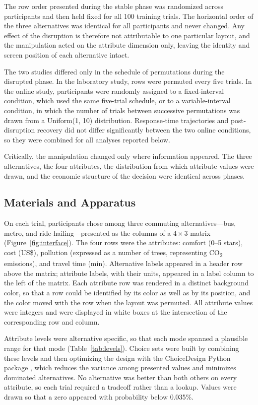 \documentclass[man,natbib,floatsintext]{apa7}
\begin{document}
The row order presented during the stable phase was randomized across participants and then held fixed for all 100 training trials. The horizontal order of the three alternatives was identical for all participants and never changed. Any effect of the disruption is therefore not attributable to one particular layout, and the manipulation acted on the attribute dimension only, leaving the identity and screen position of each alternative intact.

The two studies differed only in the schedule of permutations during the disrupted phase. In the laboratory study, rows were permuted every five trials. In the online study, participants were randomly assigned to a fixed-interval condition, which used the same five-trial schedule, or to a variable-interval condition, in which the number of trials between successive permutations was drawn from a Uniform(1, 10) distribution. Response-time trajectories and post-disruption recovery did not differ significantly between the two online conditions, so they were combined for all analyses reported below.

Critically, the manipulation changed only where information appeared. The three alternatives, the four attributes, the distribution from which attribute values were drawn, and the economic structure of the decision were identical across phases.

\subsection{Materials and Apparatus}

On each trial, participants chose among three commuting alternatives---bus, metro, and ride-hailing---presented as the columns of a $4 \times 3$ matrix (Figure~\ref{fig:interface}). The four rows were the attributes: comfort (0--5 stars), cost (US\$), pollution (expressed as a number of trees, representing CO\textsubscript{2} emissions), and travel time (min). Alternative labels appeared in a header row above the matrix; attribute labels, with their units, appeared in a label column to the left of the matrix. Each attribute row was rendered in a distinct background color, so that a row could be identified by its color as well as by its position, and the color moved with the row when the layout was permuted. All attribute values were integers and were displayed in white boxes at the intersection of the corresponding row and column.

Attribute levels were alternative specific, so that each mode spanned a plausible range for that mode (Table~\ref{tab:levels}). Choice sets were built by combining these levels and then optimizing the design with the ChoiceDesign Python package \citep{ignacio2020choicedesign}, which reduces the variance among presented values and minimizes dominated alternatives. No alternative was better than both others on every attribute, so each trial required a tradeoff rather than a lookup. Values were drawn so that a zero appeared with probability below 0.035\%.
\end{document}
